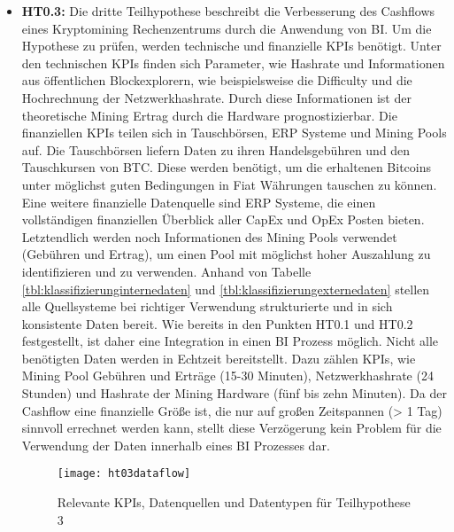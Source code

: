\begin{itemize}
    \item \textbf{\ac{HT0.3}: }Die dritte Teilhypothese beschreibt die Verbesserung des Cashflows eines Kryptomining
    Rechenzentrums durch die Anwendung von \ac{BI}. Um die Hypothese zu prüfen, werden technische und finanzielle \acp{KPI}
    benötigt. Unter den technischen \acp{KPI} finden sich Parameter, wie Hashrate und Informationen aus öffentlichen
    Blockexplorern, wie beispielsweise die Difficulty und die Hochrechnung der Netzwerkhashrate. Durch diese Informationen ist
    der theoretische Mining Ertrag durch die Hardware prognostizierbar. Die finanziellen \acp{KPI} teilen sich in Tauschbörsen,
    \ac{ERP} Systeme und Mining Pools auf. Die Tauschbörsen liefern Daten zu ihren Handelsgebühren und den Tauschkursen von
    \ac{BTC}. Diese werden benötigt, um die erhaltenen Bitcoins unter möglichst guten Bedingungen in Fiat Währungen tauschen
    zu können. Eine weitere finanzielle Datenquelle sind \ac{ERP} Systeme, die einen vollständigen finanziellen Überblick
    aller \ac{CapEx} und \ac{OpEx} Posten bieten. Letztendlich werden noch Informationen des Mining Pools verwendet (Gebühren
    und Ertrag), um einen Pool mit möglichst hoher Auszahlung zu identifizieren und zu verwenden. Anhand von Tabelle
    \ref{tbl:klassifizierunginternedaten} und \ref{tbl:klassifizierungexternedaten} stellen alle Quellsysteme bei richtiger
    Verwendung strukturierte und in sich konsistente Daten bereit. Wie bereits in den Punkten \ac{HT0.1} und \ac{HT0.2}
    festgestellt, ist daher eine Integration in einen \ac{BI} Prozess möglich. Nicht alle benötigten Daten werden in Echtzeit
    bereitstellt. Dazu zählen \acp{KPI}, wie Mining Pool Gebühren und Erträge (15-30 Minuten), Netzwerkhashrate (24 Stunden)
    und Hashrate der Mining Hardware (fünf bis zehn Minuten). Da der Cashflow eine finanzielle Größe ist, die nur auf großen
    Zeitspannen (> 1 Tag) sinnvoll errechnet werden kann, stellt diese Verzögerung kein Problem für die Verwendung der Daten
    innerhalb eines \ac{BI} Prozesses dar.

    \begin{figure}[H]
        \caption{Relevante KPIs, Datenquellen und Datentypen für Teilhypothese 3}
        \texttt{[image: ht03dataflow]}
        \label{figure:ht03dataflow}
    \end{figure}


\end{itemize}
